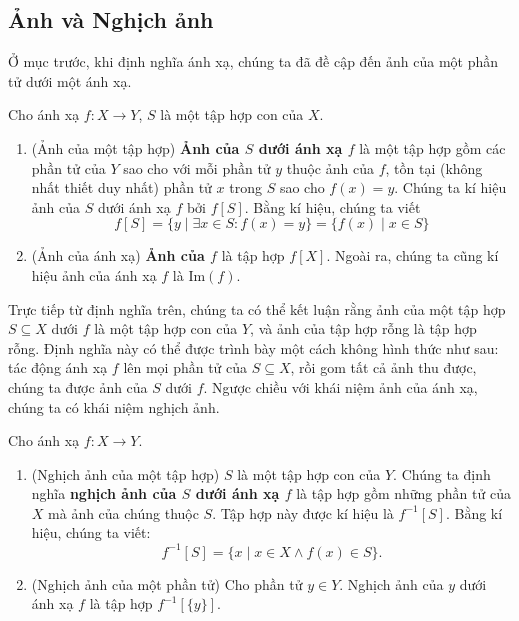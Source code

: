 \subsection{Ảnh và Nghịch ảnh}

Ở mục trước, khi định nghĩa ánh xạ, chúng ta đã đề cập đến ảnh của một phần tử dưới một ánh xạ.

\begin{definition}
    Cho ánh xạ $f: X\to Y$, $S$ là một tập hợp con của $X$.
    \begin{enumerate}[label={(\roman*)},topsep=0pt]
        \item (Ảnh của một tập hợp) \textbf{Ảnh của $S$ dưới ánh xạ $f$} là một tập hợp gồm các phần tử của $Y$ sao cho với mỗi phần tử $y$ thuộc ảnh của $f$, tồn tại (không nhất thiết duy nhất) phần tử $x$ trong $S$ sao cho $f(x) = y$. Chúng ta kí hiệu ảnh của $S$ dưới ánh xạ $f$ bởi $f[S]$. Bằng kí hiệu, chúng ta viết
              \[
                  f[S] = \{ y \mid \exists x\in S: f(x) = y \} = \{ f(x) \mid x\in S \}
              \]
        \item (Ảnh của ánh xạ) \textbf{Ảnh của $f$} là tập hợp $f[X]$. Ngoài ra, chúng ta cũng kí hiệu ảnh của ánh xạ $f$ là $\text{Im}(f)$.
    \end{enumerate}
\end{definition}

Trực tiếp từ định nghĩa trên, chúng ta có thể kết luận rằng ảnh của một tập hợp $S\subseteq X$ dưới $f$ là một tập hợp con của $Y$, và ảnh của tập hợp rỗng là tập hợp rỗng. Định nghĩa này có thể được trình bày một cách không hình thức như sau: tác động ánh xạ $f$ lên mọi phần tử của $S\subseteq X$, rồi gom tất cả ảnh thu được, chúng ta được ảnh của $S$ dưới $f$. Ngược chiều với khái niệm ảnh của ánh xạ, chúng ta có khái niệm nghịch ảnh.

\begin{definition}
    Cho ánh xạ $f: X\to Y$.
    \begin{enumerate}[label={(\roman*)},topsep=0pt]
        \item (Nghịch ảnh của một tập hợp) $S$ là một tập hợp con của $Y$. Chúng ta định nghĩa \textbf{nghịch ảnh của $S$ dưới ánh xạ $f$} là tập hợp gồm những phần tử của $X$ mà ảnh của chúng thuộc $S$. Tập hợp này được kí hiệu là $f^{-1}[S]$. Bằng kí hiệu, chúng ta viết:
              \[
                  f^{-1}[S] = \{ x \mid x\in X \wedge f(x)\in S \}.
              \]
        \item (Nghịch ảnh của một phần tử) Cho phần tử $y\in Y$. Nghịch ảnh của $y$ dưới ánh xạ $f$ là tập hợp $f^{-1}[\{y\}]$.
    \end{enumerate}
\end{definition}

